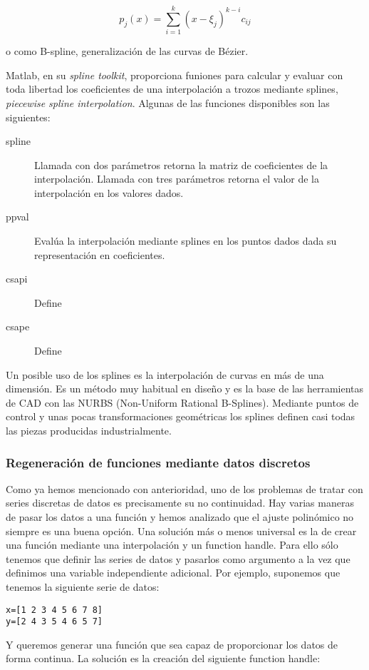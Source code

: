 $$p_j(x)=\sum_{i=1}^k(x-\xi_j)^{k-i}c_{ij}$$

o como B-spline, generalización de las curvas de Bézier.

Matlab, en su \emph{spline toolkit}, proporciona funiones para
calcular y evaluar con toda libertad los coeficientes de una
interpolación a trozos mediante splines, \emph{piecewise spline
  interpolation}.  Algunas de las funciones disponibles son las
siguientes:

\begin{description}
\item[spline] Llamada con dos parámetros retorna la
  matriz de coeficientes de la interpolación.  Llamada con tres
  parámetros retorna el valor de la interpolación en los valores
  dados.
\item[ppval] Evalúa la interpolación mediante splines en
  los puntos dados dada su representación en coeficientes.
\item[csapi] Define
\item[csape] Define
\end{description}

Un posible uso de los splines es la interpolación de curvas en más de
una dimensión.  Es un método muy habitual en diseño y es la base de
las herramientas de CAD con las NURBS (Non-Uniform Rational B-Splines).
Mediante puntos de control y unas pocas transformaciones geométricas
los splines definen casi todas las piezas producidas industrialmente.

\subsubsection{Regeneración de funciones mediante datos discretos}

Como ya hemos mencionado con anterioridad, uno de los problemas de
tratar con series discretas de datos es precisamente su no
continuidad.  Hay varias maneras de pasar los datos a una función y
hemos analizado que el ajuste polinómico no siempre es una buena
opción. Una solución más o menos universal es la de crear una función
mediante una interpolación y un function handle. Para ello sólo
tenemos que definir las series de datos y pasarlos como argumento a la
vez que definimos una variable independiente adicional. Por ejemplo,
suponemos que tenemos la siguiente serie de datos:

\begin{verbatim}
x=[1 2 3 4 5 6 7 8]
y=[2 4 3 5 4 6 5 7]
\end{verbatim}
Y queremos generar una función que sea capaz de proporcionar los datos
de forma continua. La solución es la creación del siguiente function
handle:


